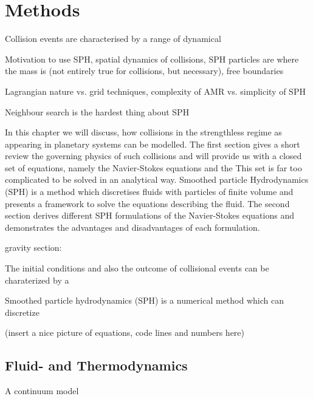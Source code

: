 \graphicspath{{./02figs/}}


\chapter{Methods}
Collision events are characterised by a 
range of dynamical 

%

Motivation to use SPH, spatial dynamics of collisions, SPH particles are where the mass is (not entirely true for collisions, but necessary), free boundaries



Lagrangian nature vs. grid techniques, complexity of AMR vs. simplicity of SPH

Neighbour search is the hardest thing about SPH



In this chapter we will discuss, how collisions in the strengthless regime as appearing in planetary systems can be modelled.
The first section gives a short review the governing physics of such collisions and will provide us with a closed set of equations, namely the Navier-Stokes equations and the 
This set is far too complicated to be solved in an analytical way. 
Smoothed particle Hydrodynamics (SPH) is a method which discretises fluids with particles of finite volume and presents a framework to solve the equations describing the fluid.
The second section derives different SPH formulations of the Navier-Stokes equations and demonstrates the advantages and disadvantages of each formulation.

gravity section: 

The initial conditions and also the outcome of collisional events can be charaterized by a 

Smoothed particle hydrodynamics (SPH) is a numerical method which can discretize 

(insert a nice picture of equations, code lines and numbers here)

\newpage

\section{Fluid- and Thermodynamics}
A continuum model 

